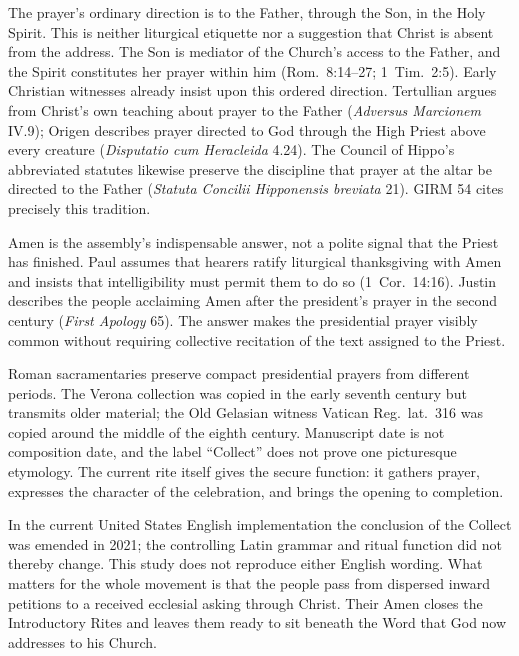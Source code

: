 The prayer's ordinary direction is to the Father, through the Son, in the Holy Spirit. This is neither liturgical etiquette nor a suggestion that Christ is absent from the address. The Son is mediator of the Church's access to the Father, and the Spirit constitutes her prayer within him (Rom.~8:14--27; 1~Tim.~2:5). Early Christian witnesses already insist upon this ordered direction. Tertullian argues from Christ's own teaching about prayer to the Father (\emph{Adversus Marcionem} IV.9); Origen describes prayer directed to God through the High Priest above every creature (\emph{Disputatio cum Heracleida} 4.24). The Council of Hippo's abbreviated statutes likewise preserve the discipline that prayer at the altar be directed to the Father (\emph{Statuta Concilii Hipponensis breviata} 21). GIRM 54 cites precisely this tradition.

Amen is the assembly's indispensable answer, not a polite signal that the Priest has finished. Paul assumes that hearers ratify liturgical thanksgiving with Amen and insists that intelligibility must permit them to do so (1~Cor.~14:16). Justin describes the people acclaiming Amen after the president's prayer in the second century (\emph{First Apology} 65). The answer makes the presidential prayer visibly common without requiring collective recitation of the text assigned to the Priest.

Roman sacramentaries preserve compact presidential prayers from different periods. The Verona collection was copied in the early seventh century but transmits older material; the Old Gelasian witness Vatican Reg.~lat.~316 was copied around the middle of the eighth century. Manuscript date is not composition date, and the label ``Collect'' does not prove one picturesque etymology. The current rite itself gives the secure function: it gathers prayer, expresses the character of the celebration, and brings the opening to completion.

In the current United States English implementation the conclusion of the Collect was emended in 2021; the controlling Latin grammar and ritual function did not thereby change. This study does not reproduce either English wording. What matters for the whole movement is that the people pass from dispersed inward petitions to a received ecclesial asking through Christ. Their Amen closes the Introductory Rites and leaves them ready to sit beneath the Word that God now addresses to his Church.
